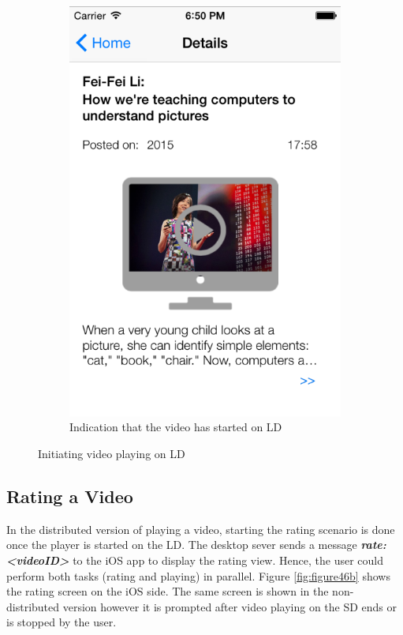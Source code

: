 \begin{figure}[!htpb]
\begin{subfigure}[b]{0.3\textwidth}
        \includegraphics[width=\textwidth]{figures/playSDc}
        \caption{Indication that the video has started on LD}
        \label{fig:figure45c}
    \end{subfigure}
    \caption{Initiating video playing on LD}\label{fig:figure45}
\end{figure} 
\subsection{Rating a Video}
In the distributed version of playing a video, starting the rating scenario is done once the player is started on the LD. The desktop sever sends a message \textbf{\textit{rate:<videoID>}} to the iOS app to display the rating view. Hence, the user could perform both tasks (rating and playing) in parallel. Figure \ref{fig:figure46b} shows the rating screen on the iOS side.
The same screen is shown in the non-distributed version however it is prompted after video playing on the SD ends or is stopped by the user.

